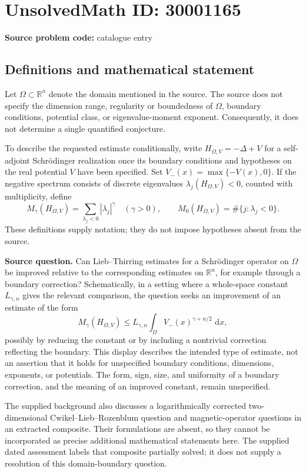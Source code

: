 \documentclass[11pt]{article}
\newcommand{\R}{\mathbb{R}}
\newcommand{\dd}{\,\mathrm{d}}
\begin{document}
\section*{UnsolvedMath ID: 30001165}
\textbf{Source problem code:} catalogue entry
\subsection{Definitions and mathematical statement}
Let \(\Omega\subset\R^n\) denote the domain mentioned in the source. The source does not specify the dimension range, regularity or boundedness of \(\Omega\), boundary conditions, potential class, or eigenvalue-moment exponent. Consequently, it does not determine a single quantified conjecture.

To describe the requested estimate conditionally, write \(H_{\Omega,V}=-\Delta+V\) for a self-adjoint Schrödinger realization once its boundary conditions and hypotheses on the real potential \(V\) have been specified. Set \(V_-(x)=\max\{-V(x),0\}\). If the negative spectrum consists of discrete eigenvalues \(\lambda_j(H_{\Omega,V})<0\), counted with multiplicity, define
\[
M_\gamma(H_{\Omega,V})=\sum_{\lambda_j<0}|\lambda_j|^\gamma\quad(\gamma>0),
\qquad
M_0(H_{\Omega,V})=\#\{j:\lambda_j<0\}.
\]
These definitions supply notation; they do not impose hypotheses absent from the source.

\textbf{Source question.} Can Lieb--Thirring estimates for a Schrödinger operator on \(\Omega\) be improved relative to the corresponding estimates on \(\R^n\), for example through a boundary correction? Schematically, in a setting where a whole-space constant \(L_{\gamma,n}\) gives the relevant comparison, the question seeks an improvement of an estimate of the form
\[
M_\gamma(H_{\Omega,V})\le L_{\gamma,n}\int_\Omega V_-(x)^{\gamma+n/2}\,\dd x,
\]
possibly by reducing the constant or by including a nontrivial correction reflecting the boundary. This display describes the intended type of estimate, not an assertion that it holds for unspecified boundary conditions, dimensions, exponents, or potentials. The form, sign, size, and uniformity of a boundary correction, and the meaning of an improved constant, remain unspecified.

The supplied background also discusses a logarithmically corrected two-dimensional Cwikel--Lieb--Rozenblum question and magnetic-operator questions in an extracted composite. Their formulations are absent, so they cannot be incorporated as precise additional mathematical statements here. The supplied dated assessment labels that composite partially solved; it does not supply a resolution of this domain-boundary question.
\end{document}
